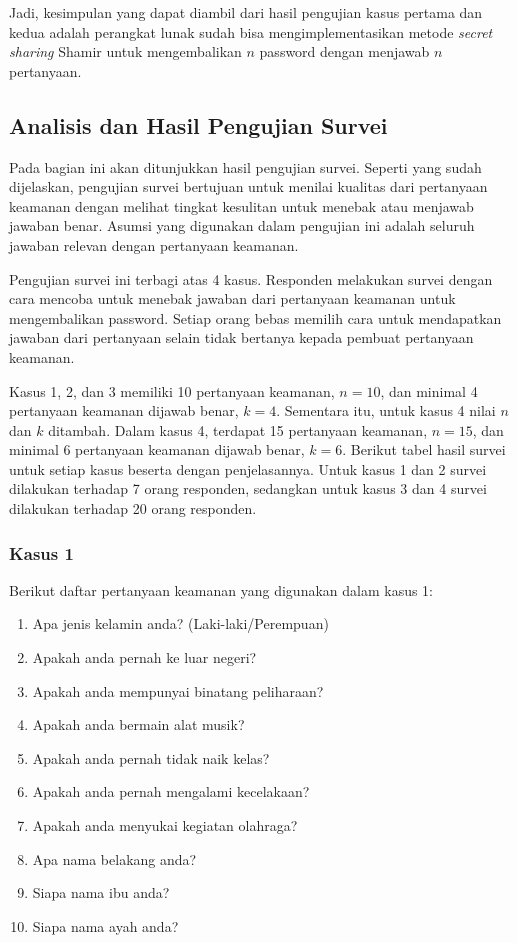 Jadi, kesimpulan yang dapat diambil dari hasil pengujian kasus pertama dan kedua adalah perangkat lunak sudah bisa mengimplementasikan metode \textit{secret sharing} Shamir untuk mengembalikan $n$ password dengan menjawab $n$ pertanyaan.

\subsection{Analisis dan Hasil Pengujian Survei}\label{subsec:hasil_pengujian_survei}

Pada bagian ini akan ditunjukkan hasil pengujian survei. Seperti yang sudah dijelaskan, pengujian survei bertujuan untuk menilai kualitas dari pertanyaan keamanan dengan melihat tingkat kesulitan untuk menebak atau menjawab jawaban benar. Asumsi yang digunakan dalam pengujian ini adalah seluruh jawaban relevan dengan pertanyaan keamanan.

Pengujian survei ini terbagi atas 4 kasus. Responden melakukan survei dengan cara mencoba untuk menebak jawaban dari pertanyaan keamanan untuk mengembalikan password. Setiap orang bebas memilih cara untuk mendapatkan jawaban dari pertanyaan selain tidak bertanya kepada pembuat pertanyaan keamanan.

Kasus 1, 2, dan 3 memiliki 10 pertanyaan keamanan, $n=10$, dan minimal 4 pertanyaan keamanan dijawab benar, $k=4$. Sementara itu, untuk kasus 4 nilai $n$ dan $k$ ditambah. Dalam kasus 4, terdapat 15 pertanyaan keamanan, $n=15$, dan minimal 6 pertanyaan keamanan dijawab benar, $k=6$. Berikut tabel hasil survei untuk setiap kasus beserta dengan penjelasannya. Untuk kasus 1 dan 2 survei dilakukan terhadap 7 orang responden, sedangkan untuk kasus 3 dan 4 survei dilakukan terhadap 20 orang responden.

\subsubsection{Kasus 1}

Berikut daftar pertanyaan keamanan yang digunakan dalam kasus 1:

\begin{enumerate}[itemsep=0mm]
	\item Apa jenis kelamin anda? (Laki-laki/Perempuan)
	\item Apakah anda pernah ke luar negeri?
	\item Apakah anda mempunyai binatang peliharaan?
	\item Apakah anda bermain alat musik?
	\item Apakah anda pernah tidak naik kelas?
	\item Apakah anda pernah mengalami kecelakaan?
	\item Apakah anda menyukai kegiatan olahraga?
	\item Apa nama belakang anda?
	\item Siapa nama ibu anda?
	\item Siapa nama ayah anda?
\end{enumerate}

